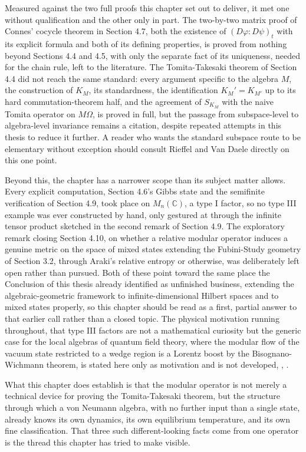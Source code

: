 Measured against the two full proofs this chapter set out to deliver, it met one without qualification and the other only in part. The two-by-two matrix proof of Connes' cocycle theorem in Section 4.7, both the existence of $(D\varphi:D\psi)_t$ with its explicit formula and both of its defining properties, is proved from nothing beyond Sections 4.4 and 4.5, with only the separate fact of its uniqueness, needed for the chain rule, left to the literature. The Tomita-Takesaki theorem of Section 4.4 did not reach the same standard: every argument specific to the algebra $M$, the construction of $K_M$, its standardness, the identification $K_M'=K_{M'}$ up to its hard commutation-theorem half, and the agreement of $S_{K_M}$ with the naive Tomita operator on $M\Omega$, is proved in full, but the passage from subspace-level to algebra-level invariance remains a citation, despite repeated attempts in this thesis to reduce it further. A reader who wants the standard subspace route to be elementary without exception should consult Rieffel and Van Daele directly on this one point.

Beyond this, the chapter has a narrower scope than its subject matter allows. Every explicit computation, Section 4.6's Gibbs state and the semifinite verification of Section 4.9, took place on $M_n(\mathbb{C})$, a type I factor, so no type III example was ever constructed by hand, only gestured at through the infinite tensor product sketched in the second remark of Section 4.9. The exploratory remark closing Section 4.10, on whether a relative modular operator induces a genuine metric on the space of mixed states extending the Fubini-Study geometry of Section 3.2, through Araki's relative entropy or otherwise, was deliberately left open rather than pursued. Both of these point toward the same place the Conclusion of this thesis already identified as unfinished business, extending the algebraic-geometric framework to infinite-dimensional Hilbert spaces and to mixed states properly, so this chapter should be read as a first, partial answer to that earlier call rather than a closed topic. The physical motivation running throughout, that type III factors are not a mathematical curiosity but the generic case for the local algebras of quantum field theory, where the modular flow of the vacuum state restricted to a wedge region is a Lorentz boost by the Bisognano-Wichmann theorem, is stated here only as motivation and is not developed, \cite[TODO: collocazione precisa]{TODO-BisognanoWichmann}, \cite[TODO: collocazione precisa]{TODO-Haag}.

What this chapter does establish is that the modular operator is not merely a technical device for proving the Tomita-Takesaki theorem, but the structure through which a von Neumann algebra, with no further input than a single state, already knows its own dynamics, its own equilibrium temperature, and its own fine classification. That three such different-looking facts come from one operator is the thread this chapter has tried to make visible.

